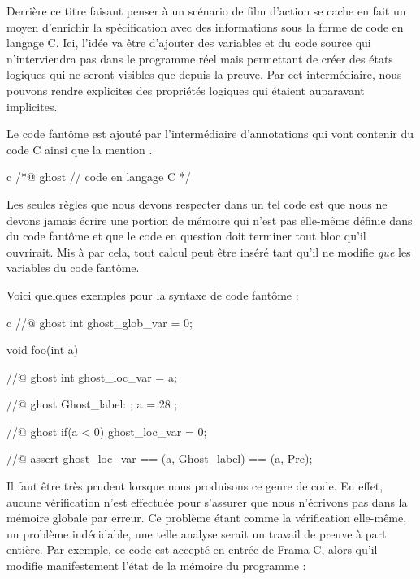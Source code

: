Derrière ce titre faisant penser à un scénario de film d'action se cache en fait
un moyen d'enrichir la spécification avec des informations sous la forme de code
en langage C. Ici, l'idée va être d'ajouter des variables et du code source qui
n'interviendra pas dans le programme réel mais permettant de créer des états 
logiques qui ne seront visibles que depuis la preuve. Par cet intermédiaire, 
nous pouvons rendre explicites des propriétés logiques qui étaient auparavant
implicites.





Le code fantôme est ajouté par l'intermédiaire d'annotations qui vont contenir 
du code C ainsi que la mention .



\begin{CodeBlock}{c}
/*@
  ghost
  // code en langage C
*/
\end{CodeBlock}



Les seules règles que nous devons respecter dans un tel code est que nous ne 
devons jamais écrire une portion de mémoire qui n'est pas elle-même définie dans
du code fantôme et que le code en question doit terminer tout bloc qu'il ouvrirait.
Mis à par cela, tout calcul peut être inséré tant qu’il ne modifie \textit{que} les variables
du code fantôme.



Voici quelques exemples pour la syntaxe de code fantôme :



\begin{CodeBlock}{c}
//@ ghost int ghost_glob_var = 0;

void foo(int a){
  //@ ghost int ghost_loc_var = a;

  //@ ghost Ghost_label: ;
  a = 28 ;

  //@ ghost if(a < 0){ ghost_loc_var = 0; }

  //@ assert ghost_loc_var == \at(a, Ghost_label) == \at(a, Pre);
}
\end{CodeBlock}



Il faut être très prudent lorsque nous produisons ce genre de code. En effet, 
aucune vérification n'est effectuée pour s'assurer que nous n'écrivons pas dans
la mémoire globale par erreur. Ce problème étant comme la vérification elle-même, 
un problème indécidable, une telle analyse serait un travail de preuve à part 
entière. Par exemple, ce code est accepté en entrée de Frama-C, alors qu'il 
modifie manifestement l'état de la mémoire du programme :



